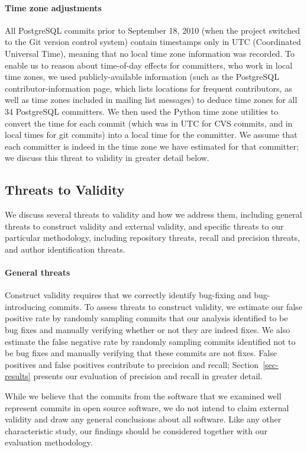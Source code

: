 \paragraph{Time zone adjustments}
All PostgreSQL commits prior to September 18, 2010 (when the project
switched to the Git version control system) contain timestamps only in UTC
(Coordinated Universal Time), meaning that no local time zone information
was recorded. To enable us to reason about time-of-day
effects for committers, who work in local time zones, we used
publicly-available information (such as the PostgreSQL
contributor-information page, which lists locations for frequent
contributors, as well as time zones included in mailing list messages) to deduce
time zones for all 34 PostgreSQL committers. We then used the Python
time zone utilities to convert the time for each commit (which was in
UTC for CVS commits, and in local times for git commits) into a local
time for the committer. We assume that each committer is indeed in
the time zone we have estimated for that committer; 
we discuss this threat to validity in greater detail below.

\subsection{Threats to Validity}
We discuss several threats to validity and how we address them,
including general threats to construct validity and external validity,
and specific threats to our particular methodology, including 
repository threats, recall and precision threats, 
and author identification threats.

\paragraph{General threats}
Construct validity requires that we correctly identify 
bug-fixing and bug-introducing commits. To assess 
threats to construct validity, 
we estimate our false positive rate by randomly sampling
commits that our analysis identified to be bug fixes and manually
verifying whether or not they are indeed fixes.  We also estimate the
false negative rate by randomly sampling commits identified not to be
bug fixes and manually verifying that these commits are not fixes.
False positives and false positives contribute to precision and 
recall; Section~\ref{sec-results} presents our evaluation 
of precision and recall 
in greater detail.

While we believe that the commits from the software that we examined
well represent commits in open source software, we do not intend to
claim external validity and draw any general conclusions about all
software.  Like any other characteristic study, our findings should be
considered together with our evaluation methodology.

